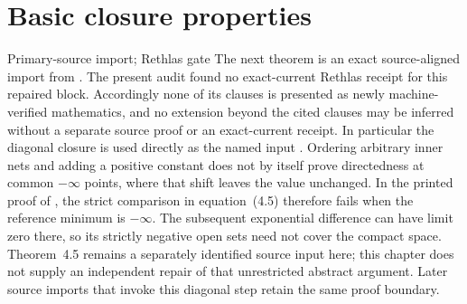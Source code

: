 \newpage
\section{Basic closure properties}
\label{sec:ch34-closure}

\begin{warning}{Primary-source import; Rethlas gate}
The next theorem is an exact source-aligned import from
\cite[Definition~4.1, Theorems~4.5 and~4.7, Lemmas~4.6 and~4.9,
Proposition~4.12, Corollary~4.17, Theorem~4.22, and
Corollary~4.23]{BJ22}.  The present audit
found no exact-current Rethlas receipt for this repaired block.  Accordingly
none of its clauses is presented as newly machine-verified mathematics, and
no extension beyond the cited clauses may be inferred without a separate
source proof or an exact-current receipt.
In particular the diagonal closure is used directly as the named
input \cite[Theorem~4.5]{BJ22}.  Ordering arbitrary inner nets and
adding a positive constant does not by itself prove directedness at
common $-\infty$ points, where that shift leaves the value unchanged.
In the printed proof of \cite[Lemma~4.6]{BJ22}, the strict comparison
in equation~(4.5) therefore fails when the reference minimum is
$-\infty$.  The subsequent exponential difference can have limit zero
there, so its strictly negative open sets need not cover the compact
space.  Theorem~4.5 remains a separately identified source input here;
this chapter does not supply an independent repair of that unrestricted
abstract argument.
Later source imports that invoke this diagonal step retain the same
proof boundary.
\end{warning}


